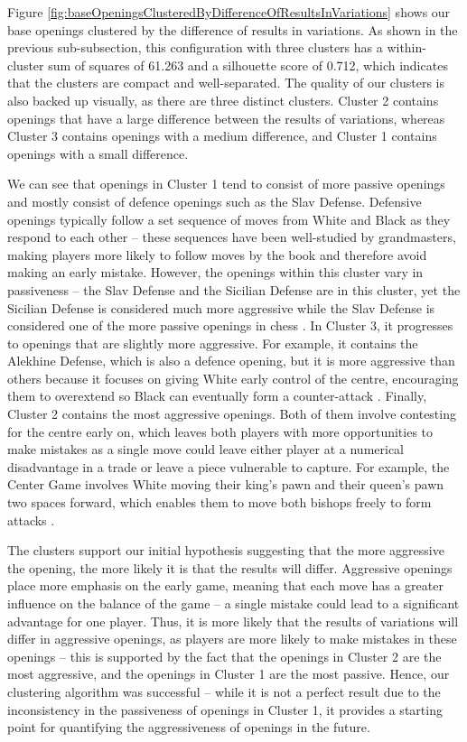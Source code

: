 \documentclass[a4paper, 11pt]{article}
\begin{document}
Figure \ref{fig:baseOpeningsClusteredByDifferenceOfResultsInVariations} shows our base openings clustered by the difference of results in variations. As shown in the previous sub-subsection, this configuration with three clusters has a within-cluster sum of squares of 61.263 and a silhouette score of 0.712, which indicates that the clusters are compact and well-separated. The quality of our clusters is also backed up visually, as there are three distinct clusters. Cluster 2 contains openings that have a large difference between the results of variations, whereas Cluster 3 contains openings with a medium difference, and Cluster 1 contains openings with a small difference.

We can see that openings in Cluster 1 tend to consist of more passive openings and mostly consist of defence openings such as the Slav Defense. Defensive openings typically follow a set sequence of moves from White and Black as they respond to each other -- these sequences have been well-studied by grandmasters, making players more likely to follow moves by the book and therefore avoid making an early mistake. However, the openings within this cluster vary in passiveness -- the Slav Defense and the Sicilian Defense are in this cluster, yet the Sicilian Defense is considered much more aggressive while the Slav Defense is considered one of the more passive openings in chess \cite{slavDefenseAnalysis}. In Cluster 3, it progresses to openings that are slightly more aggressive. For example, it contains the Alekhine Defense, which is also a defence opening, but it is more aggressive than others because it focuses on giving White early control of the centre, encouraging them to overextend so Black can eventually form a counter-attack \cite{alekhinesDefenseAnalysis}. Finally, Cluster 2 contains the most aggressive openings. Both of them involve contesting for the centre early on, which leaves both players with more opportunities to make mistakes as a single move could leave either player at a numerical disadvantage in a trade or leave a piece vulnerable to capture. For example, the Center Game involves White moving their king's pawn and their queen's pawn two spaces forward, which enables them to move both bishops freely to form attacks \cite{centerGameAnalysis}.

The clusters support our initial hypothesis suggesting that the more aggressive the opening, the more likely it is that the results will differ. Aggressive openings place more emphasis on the early game, meaning that each move has a greater influence on the balance of the game -- a single mistake could lead to a significant advantage for one player. Thus, it is more likely that the results of variations will differ in aggressive openings, as players are more likely to make mistakes in these openings -- this is supported by the fact that the openings in Cluster 2 are the most aggressive, and the openings in Cluster 1 are the most passive. Hence, our clustering algorithm was successful -- while it is not a perfect result due to the inconsistency in the passiveness of openings in Cluster 1, it provides a starting point for quantifying the aggressiveness of openings in the future.
\end{document}
